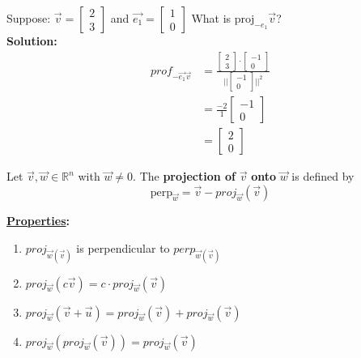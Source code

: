 \documentclass[11pt]{article}
\theoremstyle{plain}
\theoremstyle{remark}
\theoremstyle{plain}
\newcommand{\bd}{\textbf}
\newcommand{\rn}{\mathbb{R}}
\begin{document}
\begin{tcolorbox}[colback=magenta!5!white,colframe=magenta!75!black,title=Example]
    Suppose: $\overrightarrow{v} = \begin{bmatrix}
        2 \\3
    \end{bmatrix}$ and $\overrightarrow{e_1} = \begin{bmatrix}
        1\\0
    \end{bmatrix}$ What is $\text{proj}_{-e_1}\overrightarrow{v}$?\\

    \bd{Solution:}
    \begin{align*}
        prof_{-\overrightarrow{e_1}\overrightarrow{v}} &= \frac{\begin{bmatrix}
            2\\3
        \end{bmatrix}\cdot \begin{bmatrix}
            -1\\0
        \end{bmatrix}}{||\begin{bmatrix}
            -1 \\0 
        \end{bmatrix} ||^2} \\
        &=\frac{-2}{1}\begin{bmatrix}
            -1\\0
        \end{bmatrix} \\
        &=\begin{bmatrix}
            2\\0
        \end{bmatrix}
    \end{align*}
\end{tcolorbox}   

\begin{tcolorbox}[colback=green!5!white,colframe=green!75!black,title=Definition]
    Let $\overrightarrow{v}, \overrightarrow{w}\in\rn^n$ with $\overrightarrow{w}\neq 0$. The \bd{projection of} $\overrightarrow{v}$ \bd{onto} 
    $\overrightarrow{w}$ is defined by
    \[\text{perp}_{\overrightarrow{w}} = \overrightarrow{v} - proj_{\overrightarrow{w}}(\overrightarrow{v})\] 
\end{tcolorbox}  

\bd{\underline{Properties}:}
\begin{enumerate}
    \item $proj_{\overrightarrow{w}(\overrightarrow{v})}$ is perpendicular to $perp_{\overrightarrow{w}(\overrightarrow{v})}$
    \item $proj_{\overrightarrow{w}}(c\overrightarrow{v}) = c\cdot proj_{\overrightarrow{w}}(\overrightarrow{v})$
    \item $proj_{\overrightarrow{w}}(\overrightarrow{v} + \overrightarrow{u}) = proj_{\overrightarrow{w}}(\overrightarrow{v}) + proj_{\overrightarrow{w}}(\overrightarrow{v})$
    \item $proj_{\overrightarrow{w}}(proj_{\overrightarrow{w}}(\overrightarrow{v})) = proj_{\overrightarrow{w}}(\overrightarrow{v})$ 
\end{enumerate} 
\end{document}

